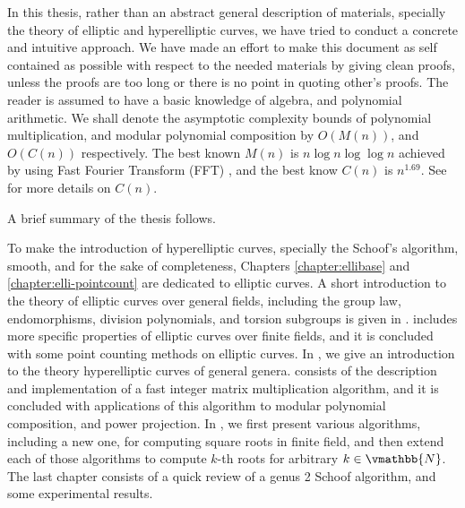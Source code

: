 In this thesis, rather than an abstract general description of materials, specially the theory of 
elliptic and hyperelliptic curves, we have tried to conduct a concrete and intuitive approach. We 
have made an effort to make this document as self contained as possible with respect to the needed 
materials by giving clean proofs, unless the proofs are too long or there is no point in quoting 
other's proofs. The reader is assumed to have a basic knowledge of algebra, and polynomial 
arithmetic. We shall denote the asymptotic complexity bounds of polynomial multiplication, and 
modular polynomial composition by $O(M(n))$, and $O(C(n))$ respectively. The best known $M(n)$ is 
$n\log n\log\log n$ achieved by using Fast Fourier Transform (FFT) \cite{Schonhage1971}, and the 
best know $C(n)$ is $n^{1.69}$. See  for more details on $C(n)$.

A brief summary of the thesis follows. 

To make the introduction of hyperelliptic curves, specially the Schoof's algorithm, smooth, and for 
the sake of completeness, Chapters \ref{chapter:ellibase} and \ref{chapter:elli-pointcount} are 
dedicated to elliptic curves. A short introduction to the theory of elliptic curves over general 
fields, including the group law, endomorphisms, division polynomials, and torsion subgroups is given 
in .  includes more specific 
properties of elliptic curves over finite fields, and it is concluded with some point counting 
methods on elliptic curves. In , we give an introduction to the 
theory hyperelliptic curves of general genera.  consists of the 
description and implementation of a fast integer matrix multiplication algorithm, and it is 
concluded with applications of this algorithm to modular polynomial composition, and power 
projection. In , we first present various algorithms, including a new 
one, for computing square roots in finite field, and then extend each of those algorithms to compute 
$k$-th roots for arbitrary $k \in \vmathbb{N}$. The last chapter consists of a quick review of a 
genus 2 Schoof algorithm, and some experimental results.